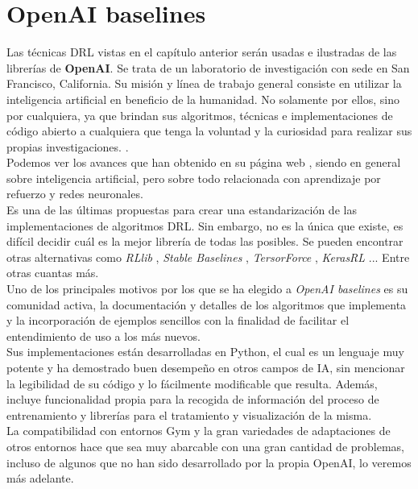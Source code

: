 \documentclass[11pt,fleqn]{book} %
\begin{document}
\chapter{OpenAI baselines}\label{sec:DRL}

Las técnicas DRL vistas en el capítulo anterior serán usadas e ilustradas de las librerías de \textbf{OpenAI}. Se trata de un laboratorio de investigación con sede en San Francisco, California. Su misión y línea de trabajo general consiste en utilizar la inteligencia artificial en beneficio de la humanidad. No solamente por ellos, sino por cualquiera, ya que brindan sus algoritmos, técnicas e implementaciones de código abierto a cualquiera que tenga la voluntad y la curiosidad para realizar sus propias investigaciones. \cite{article:openAI}. \\

Podemos ver los avances que han obtenido en su página web \cite{article:openAI2}, siendo en general sobre inteligencia artificial, pero sobre todo relacionada con aprendizaje por refuerzo y redes neuronales.\\

Es una de las últimas propuestas para crear una estandarización de las implementaciones de algoritmos DRL. Sin embargo, no es la única que existe, es difícil decidir cuál es la mejor librería de todas las posibles. Se pueden encontrar otras alternativas como \textit{RLlib} \cite{article:RLlib}, \textit{Stable Baselines} \cite{article:stablebaselines}, \textit{TersorForce} \cite{article:tensorforce}, \textit{KerasRL} \cite{article:kerasRL}... Entre otras cuantas más. \\

Uno de los principales motivos por los que se ha elegido a \textit{OpenAI baselines} es su comunidad activa, la documentación y detalles de los algoritmos que implementa y la incorporación de ejemplos sencillos con la finalidad de facilitar el entendimiento de uso a los más nuevos. \\

Sus implementaciones están desarrolladas en Python, el cual es un lenguaje muy potente y ha demostrado buen desempeño en otros campos de IA, sin mencionar la legibilidad de su código y lo fácilmente modificable que resulta. Además, incluye funcionalidad propia para la recogida de información del proceso de entrenamiento y librerías para el tratamiento y visualización de la misma. \\

La compatibilidad con entornos Gym y la gran variedades de adaptaciones de otros entornos hace que sea muy abarcable con una gran cantidad de problemas, incluso de algunos que no han sido desarrollado por la propia OpenAI, lo veremos más adelante. \\
\end{document}
